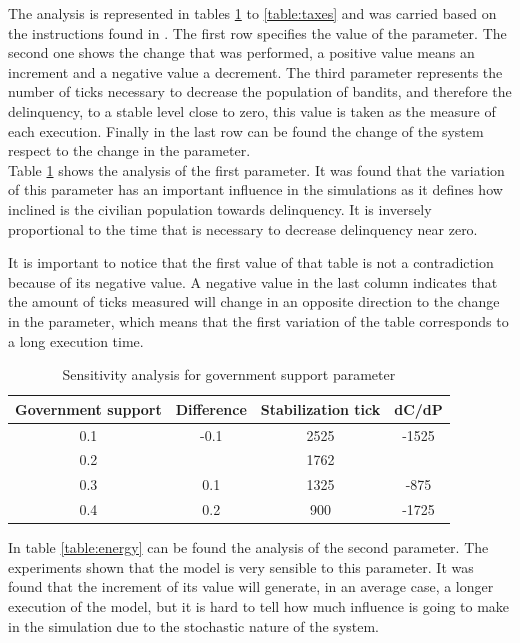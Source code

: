 \documentclass{wscpaperproc}
\begin{document}
The analysis is represented in tables \ref{table:government} to
\ref{table:taxes} and was carried based on the instructions found in
\cite{modbook}. The first row specifies the value of the parameter. The second
one shows the change that was performed, a positive value means an increment
and a negative value a decrement. The third parameter represents the number
of ticks necessary to decrease the population of bandits, and therefore the
delinquency, to a stable level close to zero, this value is taken as the
measure of each execution. Finally in the last row can be found the change of
the system respect to the change in the parameter.\\

Table \ref{table:government} shows the analysis of the first parameter. It was
found that the variation of this parameter has an important influence in the
simulations as it defines how inclined is the civilian population towards
delinquency. It is inversely proportional to the time that is necessary to
decrease delinquency near zero.

It is important to notice that the first value of that table is not a
contradiction because of its negative value. A negative value in the last
column indicates that the amount of ticks measured will change in an opposite
direction to the change in the parameter, which means that the first variation
of the table corresponds to a long execution time.\\

\begin{table}[h!]
    \centering
    \begin{tabular}{|c|c|c|c|}
        \hline
        Government support & Difference & Stabilization tick &  dC/dP\\
        \hline
        0.1 & -0.1 & 2525 & -1525\\
        \hline
        \rowcolor{lightgray}
        0.2 &      & 1762 & \\
        \hline
        0.3 & 0.1  & 1325 & -875\\
        \hline
        0.4 & 0.2  & 900 & -1725\\
        \hline
    \end{tabular}
    \caption{Sensitivity analysis for government support parameter}
    \label{table:government}
\end{table}

In table \ref{table:energy} can be found the analysis of the second
parameter. The experiments shown that the model is very sensible to this
parameter. It was found that the increment of its value will generate,
in an average case, a longer execution of the model, but it is hard to tell how
much influence is going to make in the simulation due to the stochastic
nature of the system.\\
\end{document}
